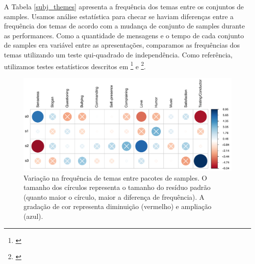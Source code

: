 A Tabela \ref{subj_themes} apresenta a frequência dos temas entre os conjuntos de samples. Usamos análise estatística para checar se haviam diferenças entre a frequência dos temas de acordo com a mudança de conjunto de samples durante as performances. Como a quantidade de mensagens e o tempo de cada conjunto de samples era variável entre as apresentações, comparamos as frequências dos temas utilizando um teste qui-quadrado de independência. Como referência, utilizamos testes estatísticos descritos em \footnote{\cite{beasley1995multiple}} e \footnote{\cite{garcia2003cellwise}}. 


\begin{figure}

\includegraphics[width=1\linewidth]{pictures/cap3/p_values}
\caption{Variação na frequência de temas entre pacotes de samples. O tamanho dos círculos representa o tamanho do resíduo padrão (quanto maior o círculo, maior a diferença de frequência). A gradação de cor representa diminuição (vermelho) e ampliação (azul).}
\label{fig:bblplot2}
\end{figure}

